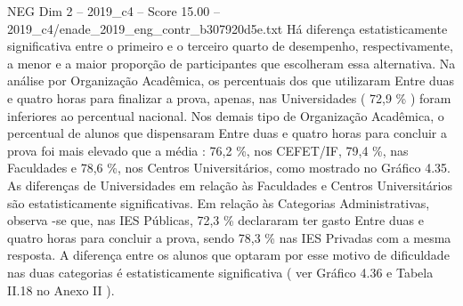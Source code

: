 \begin{textsample}{NEG Dim 2 – 2019\_c4 – Score 15.00 – 2019\_c4/enade\_2019\_eng\_contr\_b307920d5e.txt}
Há diferença estatisticamente significativa entre o primeiro e o terceiro quarto de desempenho, respectivamente, a menor e a maior proporção de participantes que escolheram essa alternativa.
Na análise por Organização Acadêmica, os percentuais dos que utilizaram Entre duas e quatro horas para finalizar a prova, apenas, nas Universidades ( 72,9 \% ) foram inferiores ao percentual nacional.
Nos demais tipo de Organização Acadêmica, o percentual de alunos que dispensaram Entre duas e quatro horas para concluir a prova foi mais elevado que a média : 76,2 \%, nos CEFET/IF, 79,4 \%, nas Faculdades e 78,6 \%, nos Centros Universitários, como mostrado no Gráfico 4.35.
As diferenças de Universidades em relação às Faculdades e Centros Universitários são estatisticamente significativas.
Em relação às Categorias Administrativas, observa -se que, nas IES Públicas, 72,3 \% declararam ter gasto Entre duas e quatro horas para concluir a prova, sendo 78,3 \% nas IES Privadas com a mesma resposta.
A diferença entre os alunos que optaram por esse motivo de dificuldade nas duas categorias é estatisticamente significativa ( ver Gráfico 4.36 e Tabela II.18 no Anexo II ).

\end{textsample}
